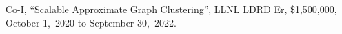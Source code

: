 \item Co-I,
	``Scalable Approximate Graph Clustering'',
	LLNL LDRD Er,
	\$1,500,000,
	October 1,~2020 to September 30,~2022.
